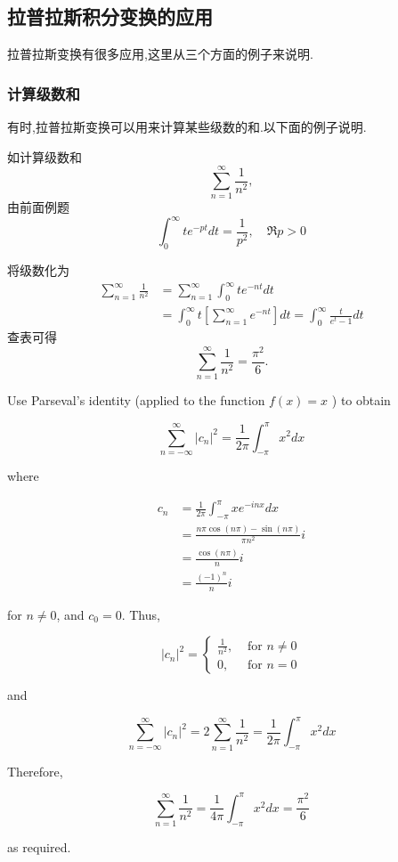 \subsection{拉普拉斯积分变换的应用}
\label{subsec:applications}
拉普拉斯变换有很多应用,这里从三个方面的例子来说明.
\subsubsection{计算级数和}
有时,拉普拉斯变换可以用来计算某些级数的和.以下面的例子说明.

如计算级数和
$$
    \sum_{n=1} ^{\infty}  \frac{1}{n^2},
$$
由前面例题
$$
\int_0^{\infty} t e^{-p t} d t=\frac{1}{p^2}, \quad \Re p>0
$$

将级数化为
$$
\begin{aligned}
\sum_{n= 1}^{\infty} \frac{1}{n^2} & =\sum_{n=1}^{\infty} \int_0^{\infty} t e^{-n t} d t \\
& =\int_0^{\infty} t\left[\sum_{n=1}^{\infty} e^{-n t}\right] d t=\int_0^{\infty} \frac{t}{e^t-1} d t
\end{aligned}
$$
查表可得
\begin{equation}
    \sum_{n=1} ^{\infty}  \frac{1}{n^2} = \frac{\pi^2}{6}.
\end{equation}

\begin{note}
    Use Parseval's identity (applied to the function $f(x)=x$ ) to obtain

    $$
    \sum_{n=-\infty}^{\infty}\left|c_n\right|^2=\frac{1}{2 \pi} \int_{-\pi}^\pi x^2 d x
    $$
    
    where
    
    $$
    \begin{aligned}
    c_n & =\frac{1}{2 \pi} \int_{-\pi}^\pi x e^{-i n x} d x \\
    & =\frac{n \pi \cos (n \pi)-\sin (n \pi)}{\pi n^2} i \\
    & =\frac{\cos (n \pi)}{n} i \\
    & =\frac{(-1)^n}{n} i
    \end{aligned}
    $$
    
    for $n \neq 0$, and $c_0=0$. Thus,
    
    $$
    \left|c_n\right|^2= \begin{cases}\frac{1}{n^2}, & \text { for } n \neq 0 \\ 0, & \text { for } n=0\end{cases}
    $$
    
    and
    
    $$
    \sum_{n=-\infty}^{\infty}\left|c_n\right|^2=2 \sum_{n=1}^{\infty} \frac{1}{n^2}=\frac{1}{2 \pi} \int_{-\pi}^\pi x^2 d x
    $$
    
    
    Therefore,
    
    $$
    \sum_{n=1}^{\infty} \frac{1}{n^2}=\frac{1}{4 \pi} \int_{-\pi}^\pi x^2 d x=\frac{\pi^2}{6}
    $$
    
    as required.
\end{note}

